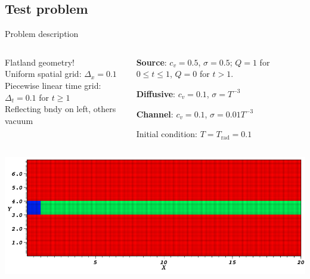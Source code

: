 \documentclass{beamer}
\begin{document}
\subsection{Test problem}
\begin{frame}{Problem description}
  \begin{columns}[t]
    \begin{column}{.48\textwidth}
      Flatland geometry!
      \\Uniform spatial grid: $\Delta_x=0.1$
      \\Piecewise linear time grid: $\Delta_t=0.1$ for $t \ge 1$
      \\Reflecting bndy on left, others vacuum
    \end{column}
    \begin{column}{.48\textwidth}
      \textcolor[rgb]{0,0,1}{\textbf{Source}}: $c_v=0.5$, $\sigma=0.5$;
      $Q=1$ for $0 \le t \le 1$, $Q=0$ for $t > 1$.

      \textcolor[rgb]{1,0,0}{\textbf{Diffusive}}: $c_v=0.1$,
      $\sigma=T^{-3}$

      \textcolor[rgb]{0.1,0.9,0.1}{\textbf{Channel}}: $c_v=0.1$,
      $\sigma=0.01 T^{-3}$

      Initial condition: $T=T_\text{rad}=0.1$
    \end{column}
  \end{columns}
\begin{center}
  \includegraphics[width=.99\textwidth]{crashpipe2/materials}
\end{center}
\end{frame}
\end{document}
